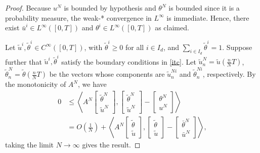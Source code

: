 \documentclass[12pt]{amsart}
\newcommand{\1}{{\chi}}
\newcommand{\lb}{\left(}
\newcommand{\rb}{\right)}
\theoremstyle{definition}
\begin{document}
    \begin{proof}
    	Because $u^N$ is bounded by hypothesis and $\theta^N$ is bounded since it is a probability measure, the weak-* convergence in $L^\infty$ is immediate. Hence,  there exist $\bar u^i \in L^\infty([0,T])$ and $\theta^i \in L^\infty([0,T])$ as claimed. 
		
    	Let $\tilde u^{i}, \tilde \theta^{i} \in C^{\infty}([0,T])$, with $\tilde \theta^{i} \geq 0$ for all $i\in I_d$, and $\sum_{i \in I_d} \tilde \theta^i =1$. Suppose further that $\tilde u^{i}, \tilde \theta^{i}$ satisfy the boundary conditions in \eqref{itc}.
		Let $\tilde u_n^{N} = \tilde u \lb \frac{n}{N}T \rb$, $\tilde \theta_n^{N} = \tilde \theta \lb \frac{n}{N}T \rb$ be the vectors whose components are $\tilde u_n^{N i}$ and
		$\tilde \theta_n^{N i}$, respectively.
		By the monotonicity of $A^N$, we have
		\begin{align*}
			0 &\leq \left\langle A^N\left[\begin{array}{c}
											\tilde \theta^N \\
                                			\tilde u^N
                                		 \end{array}
									 \right],
								\left[\begin{array}{c}
                                	\tilde \theta^N\\
                                	\tilde u^N
                                \end{array}\right]
								-\left[\begin{array}{c}
                                			\theta^N\\
                                			u^N
                                		\end{array}
								 \right]
					\right\rangle \\
				& = O \lb \frac{1}{N} \rb 
				  +\left\langle
				  		A^N \left[\begin{array}{c}
									\tilde\theta\\
                                	\tilde u
                                \end{array}\right],
						\left[\begin{array}{c}
									\tilde \theta\\
						            \tilde u
						      \end{array}
						\right]
						- \left[\begin{array}{c}
									\bar \theta^N\\
						            \bar u^N
						   		 \end{array}
						\right]
				   \right \rangle,
		\end{align*}
		taking the limit $N\to \infty$ gives the result. 
    \end{proof}
\end{document}

